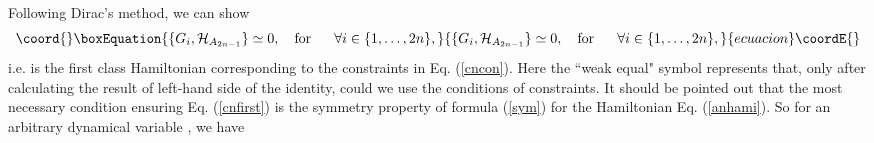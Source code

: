 \documentclass[a4paper,12pt]{article}
\begin{document}
\noindent Following Dirac's method\cite{Dirac}, we can show
\begin{equation}\coord{}\boxEquation{
\{G_{i},\mathcal{H}_{A_{2n-1}}\}\simeq 0,\mbox{\ \ \ for \ \ \ \ }\forall
i\in \{1,\ldots ,2n\},	\label{cnfirst}
}{
\{G_{i},\mathcal{H}_{A_{2n-1}}\}\simeq 0,\mbox{\ \ \ for \ \ \ \ }\forall
i\in \{1,\ldots ,2n\},	}{ecuacion}\coordE{}\end{equation}
i.e. \coordHE{} is the first class Hamiltonian
corresponding to the constraints in Eq. (\ref{cncon}). Here
the ``weak equal" symbol \myHighlight{$\simeq $}\coordHE{} represents that, only after calculating
the result of left-hand side of the identity, could we use
the conditions of constraints. It should be pointed out that
the most necessary condition ensuring Eq. (\ref{cnfirst}) is
the symmetry property of formula (\ref{sym}) for the
Hamiltonian Eq. (\ref {anhami}). So for an arbitrary
dynamical variable \coordHE{}, we have
\end{document}
